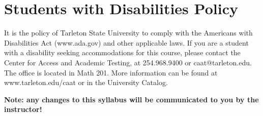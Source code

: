 \documentclass[10pt]{article}
\begin{document}
\section*{Students with Disabilities Policy}
\label{sec-10}

It is the policy of Tarleton State University to comply with the Americans with Disabilities  Act (www.ada.gov) and other applicable laws.  If you are a student with a disability seeking accommodations for this course, please contact the Center for Access and Academic Testing, at 254.968.9400 or caat@tarleton.edu. The office is located in Math 201. More information can be found at www.tarleton.edu/caat or in the University Catalog.​

\textbf{Note:  any changes to this syllabus will be communicated to you by the instructor!}
\end{document}
